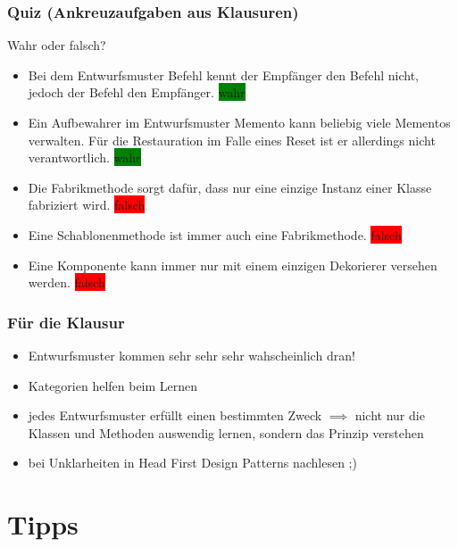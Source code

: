 \documentclass[18pt]{beamer}
\begin{document}
	\begin{frame}
		\frametitle{Quiz (Ankreuzaufgaben aus Klausuren)}
		Wahr oder falsch?
		\begin{itemize}
			\item Bei dem Entwurfsmuster Befehl kennt der Empfänger den Befehl nicht, jedoch der Befehl den Empfänger. \pause \colorbox{green}{wahr} \pause
			\item Ein Aufbewahrer im Entwurfsmuster Memento kann beliebig viele Mementos verwalten. Für die Restauration im Falle eines Reset ist er allerdings nicht verantwortlich. \pause \colorbox{green}{wahr} \pause
			\item Die Fabrikmethode sorgt dafür, dass nur eine einzige Instanz einer Klasse fabriziert wird. \pause \colorbox{red}{falsch} \pause 
			\item Eine Schablonenmethode ist immer auch eine Fabrikmethode. \pause \colorbox{red}{falsch} \pause
			\item Eine Komponente kann immer nur mit einem einzigen Dekorierer versehen werden. \pause \colorbox{red}{falsch}
		\end{itemize}
	\end{frame}
	
	
	\begin{frame}
		\frametitle{Für die Klausur}
		\begin{itemize}
			\item Entwurfsmuster kommen sehr sehr sehr wahscheinlich dran! \pause 
			\item Kategorien helfen beim Lernen \pause
			\item jedes Entwurfsmuster erfüllt einen bestimmten Zweck 
			\linebreak $\implies$ nicht nur die Klassen und Methoden auswendig lernen, sondern das Prinzip verstehen \pause
			\item bei Unklarheiten in Head First Design Patterns nachlesen ;)
		\end{itemize}
	\end{frame}
	
\section{Tipps}
\end{document}
